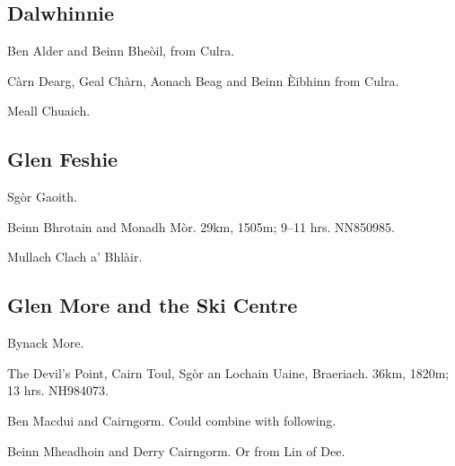 
\subsection{Dalwhinnie}

\begin{munros}
\item \target
Ben Alder and Beinn Bheòil, from Culra. \tick

\item \target Càrn Dearg, Geal Chàrn, Aonach Beag and Beinn Èibhinn from
  Culra.  \tick

\item
Meall Chuaich.  \tick
\end{munros}


\subsection{Glen Feshie}

\begin{munros}
\item Sgòr Gaoith.  \tick

\item \target Beinn Bhrotain and Monadh Mòr.  29km, 1505m; 9--11 hrs.
  NN850985.  \tick

\item Mullach Clach a' Bhlàir.
\end{munros}


\subsection{Glen More and the Ski Centre}

\begin{munros}
\item Bynack More.

\item\target The Devil's Point, Cairn Toul, Sgòr an Lochain Uaine, Braeriach.
  36km, 1820m; 13 hrs.  NH984073.  \tick

\item\target Ben Macdui and Cairngorm.  Could combine with following.  \tick

\item\target Beinn Mheadhoin and Derry Cairngorm.  Or from Lin of Dee.  \tick
\end{munros}


